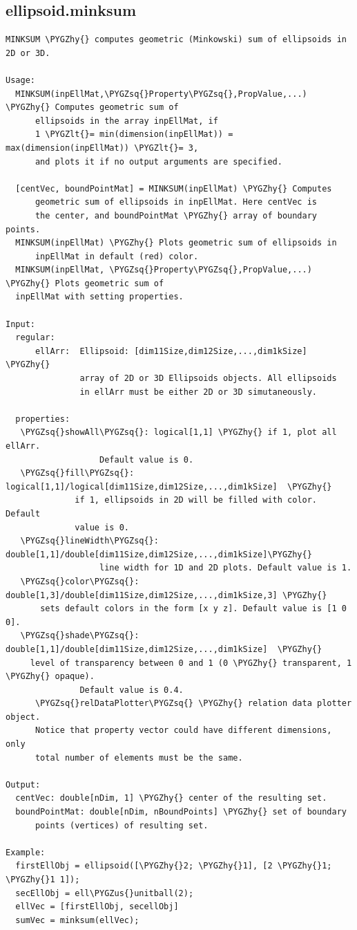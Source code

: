 \documentclass[letterpaper,10pt,english]{sphinxmanual}
\def\PYGZus{\char`\_}
\def\PYGZlt{\char`\<}
\def\PYGZhy{\char`\-}
\def\PYGZsq{\char`\'}
\begin{document}
\subsection{ellipsoid.minksum}
\label{chap_functions:ellipsoid-minksum}
\begin{Verbatim}[commandchars=\\\{\}]
MINKSUM \PYGZhy{} computes geometric (Minkowski) sum of ellipsoids in 2D or 3D.

Usage:
  MINKSUM(inpEllMat,\PYGZsq{}Property\PYGZsq{},PropValue,...) \PYGZhy{} Computes geometric sum of
      ellipsoids in the array inpEllMat, if
      1 \PYGZlt{}= min(dimension(inpEllMat)) = max(dimension(inpEllMat)) \PYGZlt{}= 3,
      and plots it if no output arguments are specified.

  [centVec, boundPointMat] = MINKSUM(inpEllMat) \PYGZhy{} Computes
      geometric sum of ellipsoids in inpEllMat. Here centVec is
      the center, and boundPointMat \PYGZhy{} array of boundary points.
  MINKSUM(inpEllMat) \PYGZhy{} Plots geometric sum of ellipsoids in
      inpEllMat in default (red) color.
  MINKSUM(inpEllMat, \PYGZsq{}Property\PYGZsq{},PropValue,...) \PYGZhy{} Plots geometric sum of
  inpEllMat with setting properties.

Input:
  regular:
      ellArr:  Ellipsoid: [dim11Size,dim12Size,...,dim1kSize] \PYGZhy{}
               array of 2D or 3D Ellipsoids objects. All ellipsoids
               in ellArr must be either 2D or 3D simutaneously.

  properties:
   \PYGZsq{}showAll\PYGZsq{}: logical[1,1] \PYGZhy{} if 1, plot all ellArr.
                   Default value is 0.
   \PYGZsq{}fill\PYGZsq{}: logical[1,1]/logical[dim11Size,dim12Size,...,dim1kSize]  \PYGZhy{}
              if 1, ellipsoids in 2D will be filled with color. Default
              value is 0.
   \PYGZsq{}lineWidth\PYGZsq{}: double[1,1]/double[dim11Size,dim12Size,...,dim1kSize]\PYGZhy{}
                   line width for 1D and 2D plots. Default value is 1.
   \PYGZsq{}color\PYGZsq{}: double[1,3]/double[dim11Size,dim12Size,...,dim1kSize,3] \PYGZhy{}
       sets default colors in the form [x y z]. Default value is [1 0 0].
   \PYGZsq{}shade\PYGZsq{}: double[1,1]/double[dim11Size,dim12Size,...,dim1kSize]  \PYGZhy{}
     level of transparency between 0 and 1 (0 \PYGZhy{} transparent, 1 \PYGZhy{} opaque).
               Default value is 0.4.
      \PYGZsq{}relDataPlotter\PYGZsq{} \PYGZhy{} relation data plotter object.
      Notice that property vector could have different dimensions, only
      total number of elements must be the same.

Output:
  centVec: double[nDim, 1] \PYGZhy{} center of the resulting set.
  boundPointMat: double[nDim, nBoundPoints] \PYGZhy{} set of boundary
      points (vertices) of resulting set.

Example:
  firstEllObj = ellipsoid([\PYGZhy{}2; \PYGZhy{}1], [2 \PYGZhy{}1; \PYGZhy{}1 1]);
  secEllObj = ell\PYGZus{}unitball(2);
  ellVec = [firstEllObj, secellObj]
  sumVec = minksum(ellVec);
\end{Verbatim}
\end{document}
